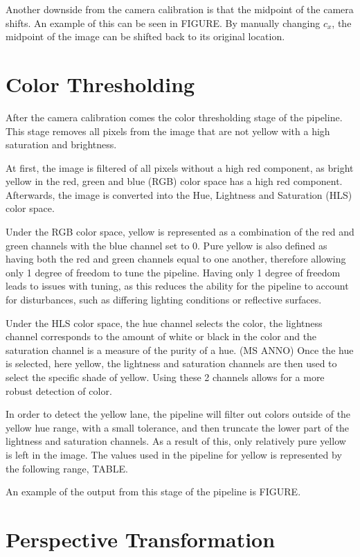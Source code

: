 \documentclass[arbeit=studie,oneside,BCOR=12mm]{ArbeitRST}
\begin{document}
Another downside from the camera calibration is that the midpoint of the camera
shifts. An example of this can be seen in FIGURE. By manually
changing $c_x$, the midpoint of the image can be shifted back to its 
original location.

\section{Color Thresholding}

After the camera calibration comes the color thresholding stage of the pipeline.
This stage removes all pixels from the image that are not yellow with a high
saturation and brightness. 

At first, the image is filtered of all pixels without a high red component, as
bright yellow in the red, green and blue (RGB) color space has a high red
component. Afterwards, the image is converted into the Hue, Lightness and
Saturation (HLS) color space. 

Under the RGB color space, yellow is represented as a combination of the red 
and green channels with the blue channel set to 0. Pure yellow is also defined 
as having both the red and green channels equal to one another, therefore 
allowing only 1 degree of freedom to tune the pipeline.  Having only 1 degree 
of freedom leads to issues with tuning, as this reduces the ability for the 
pipeline to account for disturbances, such as differing lighting conditions or 
reflective surfaces.

Under the HLS color space, the hue channel selects the color, the lightness 
channel corresponds to the amount of white or black in the color and the 
saturation channel is a measure of the purity of a hue. (MS ANNO) Once the hue 
is selected, here yellow, the lightness and saturation channels are then used 
to select the specific shade of yellow. Using these 2 channels allows for a 
more robust detection of color.

In order to detect the yellow lane, the pipeline will filter out colors outside 
of the yellow hue range, with a small tolerance, and then truncate the lower 
part of the lightness and saturation channels. As a result of this, only 
relatively pure yellow is left in the image.
The values used in the pipeline for yellow is represented by the following 
range,
TABLE.

An example of the output from this stage of the pipeline is FIGURE.

\section{Perspective Transformation}
\end{document}
